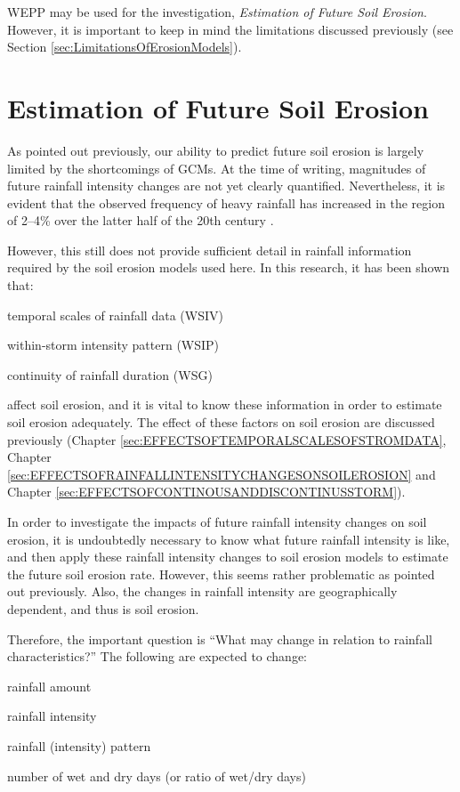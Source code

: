 WEPP may be used for the investigation, \textit{Estimation of Future Soil
Erosion}. However, it is important to keep in mind the limitations discussed
previously (see Section \ref{sec:LimitationsOfErosionModels}).


\section{Estimation of Future Soil Erosion}
\label{sec:MethodsEstimatedFutureSoilErosion}

As pointed out previously, our ability to predict future soil erosion is largely
limited by the shortcomings of GCMs. At the time of writing, magnitudes of
future rainfall intensity changes are not yet clearly quantified. Nevertheless,
it is evident that the observed frequency of heavy rainfall has increased in the
region of 2--4\% over the latter half of the 20th century
\citep{ipcc2001-881}.

However, this still does not provide sufficient detail in rainfall information
required by the soil erosion models used here. In this research, it has been
shown that:
\begin{itemize*}
\item temporal scales of rainfall data (WSIV)
\item within-storm intensity pattern (WSIP)
\item continuity of rainfall duration (WSG)
\end{itemize*}
affect soil erosion, and it is vital to know these information in order to
estimate soil erosion adequately. The effect of these factors on soil erosion
are discussed previously (Chapter \ref{sec:EFFECTSOFTEMPORALSCALESOFSTROMDATA},
Chapter \ref{sec:EFFECTSOFRAINFALLINTENSITYCHANGESONSOILEROSION} and Chapter
\ref{sec:EFFECTSOFCONTINOUSANDDISCONTINUSSTORM}).

In order to investigate the impacts of future rainfall intensity changes on soil
erosion, it is undoubtedly necessary to know what future rainfall intensity is
like, and then apply these rainfall intensity changes to soil erosion models to
estimate the future soil erosion rate. However, this seems rather problematic as
pointed out previously. Also, the changes in rainfall intensity are
geographically dependent, and thus is soil erosion.

Therefore, the important question is ``What may change in relation to rainfall
characteristics?'' The following are expected to change:
\begin{itemize*}
  \item rainfall amount
  \item rainfall intensity
  \item rainfall (intensity) pattern
  \item number of wet and dry days (or ratio of wet/dry days)
\end{itemize*}

